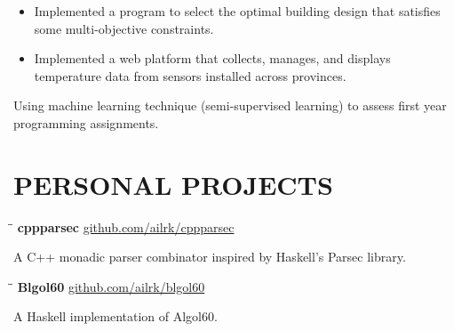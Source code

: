 \documentclass{resume}
\begin{document}
    \begin{itemize}
        \item Implemented a program to select the optimal building design that satisfies some multi-objective constraints.

        \item Implemented a web platform that collects, manages, and displays temperature data from sensors installed across provinces.
    \end{itemize}

     \vspace{-0.1in}

        Using machine learning technique (semi-supervised learning) to assess first year programming assignments.

     \vspace{-0.1in}

\section{PERSONAL PROJECTS}

    \begin{tabbing}
        \hspace{2.4in}\= \hspace{2in}\= \kill
        {\bf cppparsec } \>               \>\url{github.com/ailrk/cppparsec}\\
    \end{tabbing}

    \vspace{-0.3in}
    A C++ monadic parser combinator inspired by Haskell's Parsec library.
    \vspace{-0.15in}

    \begin{tabbing}
        \hspace{2.4in}\= \hspace{2in}\= \kill
        {\bf Blgol60 } \>               \>\url{github.com/ailrk/blgol60}\\

    \end{tabbing}
    \vspace{-0.3in}
    A Haskell implementation of Algol60.
    \vspace{-0.1in}
\end{document}
